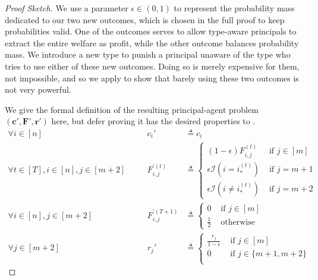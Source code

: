 \documentclass{article}
\newcommand{\indicator}[1]{\mathcal{I}\left(#1\right)}
\newcommand{\costvector}{\bm{c}}
\newcommand{\Cost}[1]{c_{#1}}
\newcommand{\TypedForecast}[3]{F^{(#1)}_{#2, #3}}
\newcommand{\ForecastTensor}{\bm{F}}
\newcommand{\rewardvector}{\bm{r}}
\newcommand{\Reward}[1]{r_{#1}}
\newcommand{\PrincipalAgentProblemPrime}{\left(\costvector', \ForecastTensor', \rewardvector'\right)}
\newcommand{\OptimalAction}{i_*}
\newcommand{\TypedOptimalAction}[1]{\OptimalAction^{(#1)}}
\newcommand{\forecastprime}[3]{F^{\prime(#1)}_{#2, #3}}
\begin{document}
\begin{proof}[Proof Sketch]
  We use a parameter $\epsilon \in (0, 1)$ to represent the probability mass dedicated to our two new outcomes, which is chosen in the full proof to keep probabilities valid. One of the outcomes serves to allow type-aware principals to extract the entire welfare as profit, while the other outcome balances probability mass. We introduce a new type to punish a principal unaware of the type who tries to use either of these new outcomes. Doing so is merely expensive for them, not impossible, and so we apply  to show that barely using these two outcomes is not very powerful.
  
  We give the formal definition of the resulting principal-agent problem $\PrincipalAgentProblemPrime$ here, but defer proving it has the desired properties to .
  \begin{alignat*}
    \forall i \in [n] \quad
    &&\Cost{i}' &\triangleq \Cost{i} \\
    \forall t \in [T], i \in [n], j \in [m+2] \quad
    &&\forecastprime{t}{i}{j} &\triangleq \begin{cases}
      (1 - \epsilon) \TypedForecast{t}{i}{j}               & \text{ if } j \in [m] \\
      \epsilon \indicator{i = \TypedOptimalAction{t}}      & \text{ if } j = m + 1 \\
      \epsilon \indicator{i \not = \TypedOptimalAction{t}} & \text{ if } j = m + 2
    \end{cases} \\
    \forall i \in [n], j \in [m+2] \quad
    &&\forecastprime{T+1}{i}{j} &\triangleq \begin{cases}
      0       & \text{ if } j \in [m] \\
      \frac12 & \text{ otherwise}
    \end{cases} \\
    \forall j \in [m+2] \quad
    &&\Reward{j}' &\triangleq \begin{cases}
      \frac{\Reward{j}}{1 - \epsilon} & \text{ if } j \in [m] \\
      0                               & \text{ if } j \in \{m+1, m+2\} \\
    \end{cases}
  \end{alignat*}
\end{proof}
\end{document}
